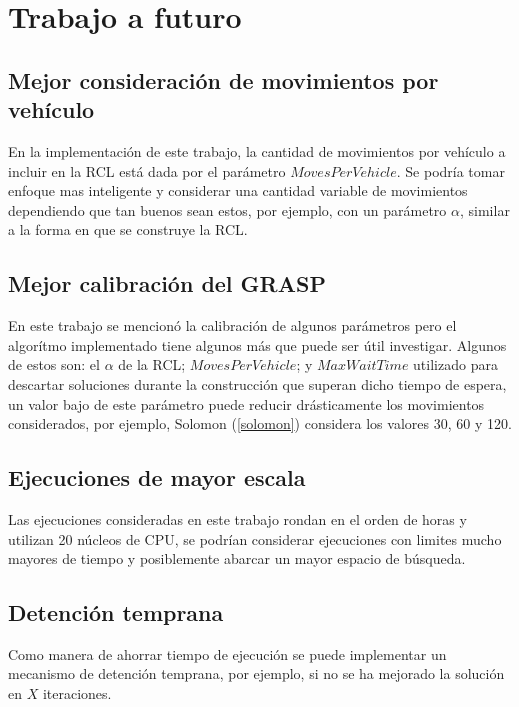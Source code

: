 \documentclass{article}
\begin{document}
  \section*{Trabajo a futuro}

  \subsection*{Mejor consideración de movimientos por vehículo}
  
  En la implementación de este trabajo, la cantidad de movimientos por vehículo a incluir en la RCL está dada por el parámetro $MovesPerVehicle$. Se podría tomar enfoque mas inteligente y considerar una cantidad variable de movimientos dependiendo que tan buenos sean estos, por ejemplo, con un parámetro $\alpha$, similar a la forma en que se construye la RCL.

  \subsection*{Mejor calibración del GRASP}

  En este trabajo se mencionó la calibración de algunos parámetros pero el algorítmo implementado tiene algunos más que puede ser útil investigar. Algunos de estos son: el $\alpha$ de la RCL; $MovesPerVehicle$; y $MaxWaitTime$ utilizado para descartar soluciones durante la construcción que superan dicho tiempo de espera, un valor bajo de este parámetro puede reducir drásticamente los movimientos considerados, por ejemplo, Solomon (\ref{solomon}) considera los valores 30, 60 y 120.

  \subsection*{Ejecuciones de mayor escala}

  Las ejecuciones consideradas en este trabajo rondan en el orden de horas y utilizan 20 núcleos de CPU, se podrían considerar ejecuciones con limites mucho mayores de tiempo y posiblemente abarcar un mayor espacio de búsqueda.

  \subsection*{Detención temprana}

  Como manera de ahorrar tiempo de ejecución se puede implementar un mecanismo de detención temprana, por ejemplo, si no se ha mejorado la solución en $X$ iteraciones.
\end{document}
